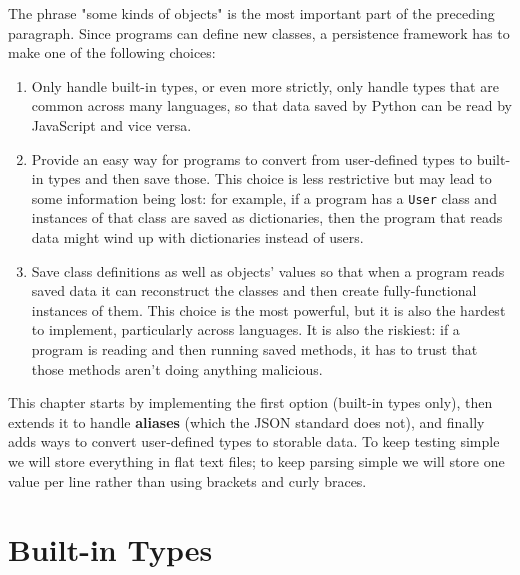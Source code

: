 \documentclass{scrbook}
\newcommand{\glossref}[1]{\textbf{#1}}
\begin{document}
The phrase "some kinds of objects" is the most important part of the preceding paragraph.
Since programs can define new classes,
a persistence framework has to make one of the following choices:

\begin{enumerate}

\item 

Only handle built-in types,
    or even more strictly,
    only handle types that are common across many languages,
    so that data saved by Python can be read by JavaScript and vice versa.



\item 

Provide an easy way for programs to convert from user-defined types
    to built-in types
    and then save those.
    This choice is less restrictive
    but may lead to some information being lost:
    for example,
    if a program has a \texttt{User} class
    and instances of that class are saved as dictionaries,
    then the program that reads data might wind up with dictionaries instead of users.



\item 

Save class definitions as well as objects' values
    so that when a program reads saved data
    it can reconstruct the classes
    and then create fully-functional instances of them.
    This choice is the most powerful,
    but it is also the hardest to implement,
    particularly across languages.
    It is also the riskiest:
    if a program is reading and then running saved methods,
    it has to trust that those methods aren't doing anything malicious.



\end{enumerate}


This chapter starts by implementing the first option (built-in types only),
then extends it to handle \glossref{aliases}
(which the JSON standard does not),
and finally adds ways to convert user-defined types to storable data.
To keep testing simple
we will store everything in flat text files;
to keep parsing simple
we will store one value per line
rather than using brackets and curly braces.

\section{Built-in Types}\label{persistence-builtin}
\end{document}
